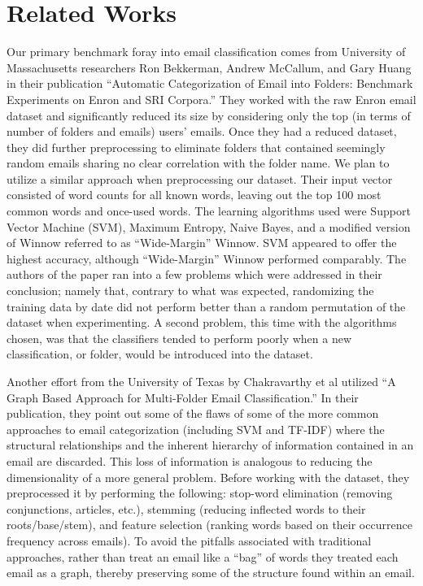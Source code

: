 \documentclass[11pt]{article}
\begin{document}
\section{Related Works}
\label{sec-2}


Our primary benchmark foray into email classification comes from University of Massachusetts researchers Ron Bekkerman, Andrew McCallum, and Gary Huang in their publication “Automatic Categorization of Email into Folders: Benchmark Experiments on Enron and SRI Corpora.”  They worked with the raw Enron email dataset and significantly reduced its size by considering only the top (in terms of number of folders and emails) users' emails. Once they had a reduced dataset, they did further preprocessing to eliminate folders that contained seemingly random emails sharing no clear correlation with the folder name. We plan to utilize a similar approach when preprocessing our dataset.
Their input vector consisted of word counts for all known words, leaving out the top 100 most common words and once-used words. The learning algorithms used were Support Vector Machine (SVM), Maximum Entropy, Naive Bayes, and a modified version of Winnow referred to as “Wide-Margin” Winnow. SVM appeared to offer the highest accuracy, although “Wide-Margin” Winnow performed comparably.
The authors of the paper ran into a few problems which were addressed in their conclusion; namely that, contrary to what was expected, randomizing the training data by date did not perform better than a random permutation of the dataset when experimenting.  A second problem, this time with the algorithms chosen, was that the classifiers tended to perform poorly when a new classification, or folder, would be introduced into the dataset.

Another effort from the University of Texas by Chakravarthy et al utilized “A Graph Based Approach for Multi-Folder Email Classification.”  In their publication, they point out some of the flaws of some of the more common approaches to email categorization (including SVM and TF-IDF) where the structural relationships and the inherent hierarchy of information contained in an email are discarded.  This loss of information is analogous to reducing the dimensionality of a more general problem.  
Before working with the dataset, they preprocessed it by performing the following: stop-word elimination (removing conjunctions, articles, etc.), stemming (reducing inflected words to their roots/base/stem), and feature selection (ranking words based on their occurrence frequency across emails).
To avoid the pitfalls associated with traditional approaches, rather than treat an email like a “bag” of words they treated each email as a graph, thereby preserving some of the structure found within an email.
\end{document}
